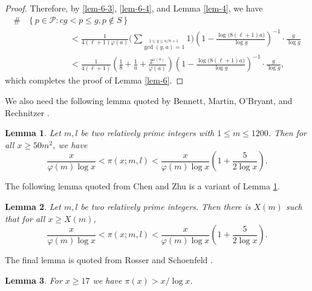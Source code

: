 \documentclass[12pt,a4paper,reqno]{amsart}
\numberwithin{equation}{section}
\def\cP{{\mathcal P}}
\theoremstyle{plain}
\newtheorem{lemma}{Lemma}
\theoremstyle{definition}
\begin{document}
\begin{proof}
 	Therefore, by \eqref{lem-6-3}, \eqref{lem-6-4}, and Lemma \ref{lem-4}, we have
 	\begin{align*}
 		\#&\left\{p\in\cP:cg< p\leq g, p\notin S \right\}\\
 	&\quad\quad\quad\quad\quad	< \frac{1}{4(\ell+1)\varphi(a)} \Bigg(\sum_{\stackrel{1\leq y\leq a/8+1}{\gcd(y,a)=1} }1\Bigg) \left( 1-\frac{\log \big(8(\ell+1)a \big)}{\log g}\right)^{-1}\cdot \frac{g}{\log g}\\
 	&\quad\quad\quad\quad\quad	<  \frac{1}{4(\ell+1)} \left( \frac{1}{8}+\frac{1}{a}+\frac{2^{\omega(a)}}{\varphi(a)} \right) \left( 1-\frac{\log \big(8(\ell+1)a \big)}{\log g}\right)^{-1}\cdot \frac{g}{\log g},
 	\end{align*}
 	which completes the proof of Lemma \ref{lem-6}.
 \end{proof}
 
 We also need the following lemma quoted by Bennett, Martin, O'Bryant, and Rechnitzer \cite[Corollay 1.6]{Bennett/Martin}.
 \begin{lemma}\label{lem-7}
 	Let $m,l$ be two relatively prime integers with $1\leq m \leq 1200$. Then for all $x\geq 50 m^{2}$, we have
 	\begin{equation*}
 		\frac{x}{\varphi(m)\log x}<\pi(x;m,l)<\frac{x}{\varphi(m)\log x}\left( 1+\frac{5}{2\log x}\right).
 	\end{equation*}
 \end{lemma}
 
 The following lemma quoted from Chen and Zhu \cite[Corollary 2.3]{Chen/Zhu-2} is a variant of Lemma \ref{lem-7}.
 
 \begin{lemma}\label{pi(x;m,l)}
 	Let $m,l$ be two relatively prime integers. Then there is $X(m)$ such that for all $x\geq X(m)$,
 	\begin{equation*}
 		\frac{x}{\varphi(m)\log x}<\pi(x;m,l)<\frac{x}{\varphi(m)\log x}\left(1+\frac{5}{2\log x}  \right).
 	\end{equation*}
 \end{lemma}
  The final lemma is quoted from Rosser and Schoenfeld \cite[Corollary 1]{RosserSchoenfeld1962}.
 \begin{lemma}\label{pi(x)estimate} 
 	 For $x\ge 17$ we have
 	$\pi (x)> x/\log x$.
 \end{lemma}
\end{document}
